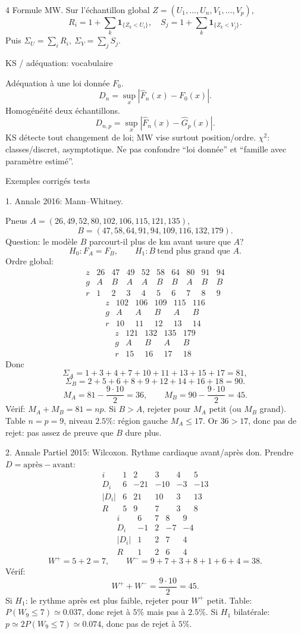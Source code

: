 \documentclass[10pt]{article}
\newcommand{\ind}{\mathbf 1}
\newcommand{\boxhead}[1]{%
  \vspace{2pt}\par\noindent #1\par\vspace{1pt}}
\newcommand{\tinytitle}[1]{#1.}
\begin{document}
\begin{multicols*}{4}
\tinytitle{Formule MW}
Sur l'échantillon global \(Z=(U_1,\ldots,U_n,V_1,\ldots,V_p)\),
\[
R_i=1+\sum_{k}\ind_{\{Z_k<U_i\}},\quad
S_j=1+\sum_{k}\ind_{\{Z_k<V_j\}}.
\]
Puis \(\Sigma_U=\sum_iR_i,\ \Sigma_V=\sum_jS_j\).

\boxhead{KS / adéquation: vocabulaire}
\tinytitle{Adéquation à une loi donnée \(F_0\)}
\[
D_n=\sup_x|\widehat F_n(x)-F_0(x)|.
\]
\tinytitle{Homogénéité deux échantillons}
\[
D_{n,p}=\sup_x|\widehat F_n(x)-\widehat G_p(x)|.
\]
KS détecte tout changement de loi; MW vise surtout position/ordre. \(\chi^2\): classes/discret, asymptotique. Ne pas confondre ``loi donnée'' et ``famille avec paramètre estimé''.

\boxhead{Exemples corrigés tests}
\tinytitle{1. Annale 2016: Mann--Whitney}\par
Pneus \(A=(26,49,52,80,102,106,115,121,135)\),
\[
B=(47,58,64,91,94,109,116,132,179).
\]
Question: le modèle \(B\) parcourt-il plus de km avant usure que \(A\)?
\[
H_0:F_A=F_B,\qquad H_1:B\ \text{tend plus grand que }A.
\]
Ordre global:
\[
\begin{array}{c|ccccccccc}
z&26&47&49&52&58&64&80&91&94\\
g&A&B&A&A&B&B&A&B&B\\
r&1&2&3&4&5&6&7&8&9
\end{array}
\]
\[
\begin{array}{c|ccccc}
z&102&106&109&115&116\\
g&A&A&B&A&B\\
r&10&11&12&13&14
\end{array}
\]
\[
\begin{array}{c|cccc}
z&121&132&135&179\\
g&A&B&A&B\\
r&15&16&17&18
\end{array}
\]
Donc
\[
\Sigma_A=1+3+4+7+10+11+13+15+17=81,
\]
\[
\Sigma_B=2+5+6+8+9+12+14+16+18=90.
\]
\[
M_A=81-\frac{9\cdot10}{2}=36,\qquad
M_B=90-\frac{9\cdot10}{2}=45.
\]
Vérif: \(M_A+M_B=81=np\). Si \(B>A\), rejeter pour \(M_A\) petit (ou \(M_B\) grand). Table \(n=p=9\), niveau \(2.5\%\): région gauche \(M_A\le17\). Or \(36>17\), donc pas de rejet: pas assez de preuve que \(B\) dure plus.

\tinytitle{2. Annale Partiel 2015: Wilcoxon}
Rythme cardiaque avant/après don. Prendre \(D=\text{après}-\text{avant}\):
\[
\begin{array}{c|ccccc}
i&1&2&3&4&5\\
D_i&6&-21&-10&-3&-13\\
|D_i|&6&21&10&3&13\\
R&5&9&7&3&8
\end{array}
\]
\[
\begin{array}{c|cccc}
i&6&7&8&9\\
D_i&-1&2&-7&-4\\
|D_i|&1&2&7&4\\
R&1&2&6&4
\end{array}
\]
\[
W^+=5+2=7,\qquad W^-=9+7+3+8+1+6+4=38.
\]
Vérif:
\[
W^++W^-=\frac{9\cdot10}{2}=45.
\]
Si \(H_1\): le rythme après est plus faible, rejeter pour \(W^+\) petit. Table: \(P(W_9\le7)\simeq0.037\), donc rejet à \(5\%\) mais pas à \(2.5\%\). Si \(H_1\) bilatérale: \(p\simeq2P(W_9\le7)\simeq0.074\), donc pas de rejet à \(5\%\).


\end{multicols*}
\end{document}
